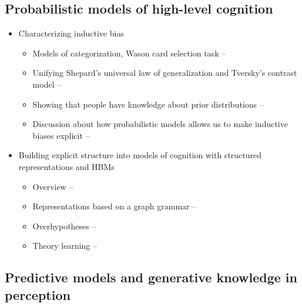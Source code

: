 \documentclass[12pt]{article}
\begin{document}
\subsection*{Probabilistic models of high-level cognition}

\begin{itemize}
\item Characterizing inductive bias
    \begin{itemize}
    \item Models of categorization, Wason card selection task -- \citep{Chater1999}
    \item Unifying Shepard's universal law of generalization and Tversky's contrast model -- \citep{Tenenbaum2001}
    \item Showing that people have knowledge about prior distributions -- \citep{Griffiths2009}
    \item Discussion about how probabilistic models allows us to make inductive biases explicit -- \citep{Griffiths2010}
    \end{itemize}

\item Building explicit structure into models of cognition with structured representations and HBMs
    \begin{itemize}
    \item Overview -- \citep{Tenenbaum2011}
    \item Representations based on a graph grammar -- \citep{Kemp2008}
    \item Overhypotheses -- \citep{Kemp2007}
    \item Theory learning -- \citep{Griffiths2009,Kemp2010,Ullman2012}
    \end{itemize}
\end{itemize}

\subsection*{Predictive models and generative knowledge in perception}
\end{document}

